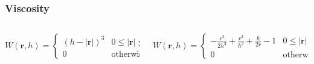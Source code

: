 \documentclass[aspectratio=169]{beamer}
\begin{document}
\begin{frame}
\frametitle{Viscosity}
\begin{columns}
\begin{column}{0.45\textwidth}
\[
W\left(\mathbf{r}, h\right) = 
\begin{cases} 
    \left(h-\left|\mathbf{r}\right|\right)^3 & 0 \leq \left|\mathbf{r}\right| \leq h \\ 
    0 & \text{otherwise.}
\end{cases}
\]
\end{column}
\begin{column}{0.45\textwidth}
{\small\[
W\left(\mathbf{r}, h\right) = 
\begin{cases} 
    -\frac{r^3}{2h^3}+\frac{r^2}{h^2}+\frac{h}{2r}-1 & 0 \leq \left|\mathbf{r}\right| \leq h \\ 
    0 & \text{otherwise.}
\end{cases}
\]}
\end{column}
\end{columns}


\end{frame}
\end{document}
